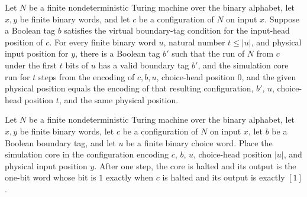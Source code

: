 \begin{lemma}
\label{Complexity.choiceCore_run}
\leanok
{}
Let $N$ be a finite nondeterministic Turing machine over the binary alphabet, let $x,y$
be finite binary words, and let $c$ be a configuration of $N$ on input $x$. Suppose a
Boolean tag $b$ satisfies the virtual boundary-tag condition for the input-head position
of $c$. For every finite binary word $u$, natural number $t\le |u|$, and physical input
position for $y$, there is a Boolean tag $b'$ such that the run of $N$ from $c$ under
the first $t$ bits of $u$ has a valid boundary tag $b'$, and the simulation core run for
$t$ steps from the encoding of $c,b,u$, choice-head position $0$, and the given physical
position equals the encoding of that resulting configuration, $b'$, $u$, choice-head
position $t$, and the same physical position.
\end{lemma}

\begin{lemma}
\label{Complexity.choiceCore_finish}
\leanok
{}
Let $N$ be a finite nondeterministic Turing machine over the binary alphabet, let $x,y$
be finite binary words, let $c$ be a configuration of $N$ on input $x$, let $b$ be a
Boolean boundary tag, and let $u$ be a finite binary choice word. Place the simulation
core in the configuration encoding $c$, $b$, $u$, choice-head position $|u|$, and
physical input position $y$. After one step, the core is halted and its output is the
one-bit word whose bit is $1$ exactly when $c$ is halted and its output is exactly
$[1]$.
\end{lemma}

